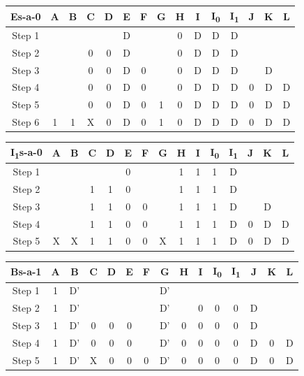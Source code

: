 \documentclass[11pt]{report}
\begin{document}
\begin{tabular}{ |c||c|c|c|c|c|c|c|c|c|c|c|c|c|c| }
\hline
\bf Es-a-0 & \bf A & \bf B & \bf C & \bf D & \bf E & \bf F & G & H & I & I\textsubscript{0} & I\textsubscript{1} & J & K & \bf L \\
\hline
\hline
Step 1 & & & & & D & & & 0 & D & D & D & & & \\
\hline
Step 2 & & & 0 & 0 & D & & & 0 & D & D & D & & & \\
\hline
Step 3 & & & 0 & 0 & D & 0 & & 0 & D & D & D & & D & \\
\hline
Step 4 & & & 0 & 0 & D & 0 & & 0 & D & D & D & 0 & D & D \\
\hline
Step 5 & & & 0 & 0 & D & 0 & 1 & 0 & D & D & D & 0 & D & D \\
\hline
Step 6 & 1 & 1 & X & 0 & D & 0 & 1 & 0 & D & D & D & 0 & D & D \\
\hline
\end{tabular}



\begin{tabular}{ |c||c|c|c|c|c|c|c|c|c|c|c|c|c|c| }
\hline
\bf I\textsubscript{1}s-a-0 & \bf A & \bf B & \bf C & \bf D & \bf E & \bf F & G & H & I & I\textsubscript{0} & I\textsubscript{1} & J & K & \bf L \\
\hline
\hline
Step 1 & & & & & 0 & & & 1 & 1 & 1 & D & & & \\
\hline
Step 2 & & & 1 & 1 & 0 & & & 1 & 1 & 1 & D & & & \\
\hline
Step 3 & & & 1 & 1 & 0 & 0 & & 1 & 1 & 1 & D & & D & \\
\hline
Step 4 & & & 1 & 1 & 0 & 0 & & 1 & 1 & 1 & D & 0 & D & D \\
\hline
Step 5 & X & X & 1 & 1 & 0 & 0 & X & 1 & 1 & 1 & D & 0 & D & D \\
\hline
\end{tabular}



\begin{tabular}{ |c||c|c|c|c|c|c|c|c|c|c|c|c|c|c| }
\hline
\bf Bs-a-1 & \bf A & \bf B & \bf C & \bf D & \bf E & \bf F & G & H & I & I\textsubscript{0} & I\textsubscript{1} & J & K & \bf L \\
\hline
\hline
Step 1 & 1 & D' & & & & & D' & & & & & & & \\
\hline
Step 2 & 1 & D' & & & & & D' & & 0 & 0 & 0 & D & & \\
\hline
Step 3 & 1 & D' & 0 & 0 & 0 & & D' & 0 & 0 & 0 & 0 & D & & \\
\hline
Step 4 & 1 & D' & 0 & 0 & 0 & & D' & 0 & 0 & 0 & 0 & D & 0 & D \\
\hline
Step 5 & 1 & D' & X & 0 & 0 & 0 & D' & 0 & 0 & 0 & 0 & D & 0 & D \\
\hline
\end{tabular}
\end{document}
